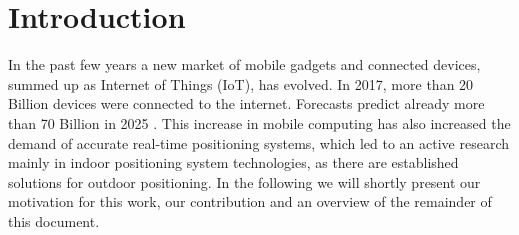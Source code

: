 
\chapter{Introduction} %

\label{Chapter1} %

In the past few years a new market of mobile gadgets and connected devices, summed up as Internet of Things (IoT), has evolved. In 2017, more than 20 Billion devices were connected to the internet. Forecasts predict already more than 70 Billion in 2025 \cite{Statista}. This increase in mobile computing has also increased the demand of accurate real-time positioning systems, which led to an active research mainly in indoor positioning system technologies, as there are established solutions for outdoor positioning.
In the following we will shortly present our motivation for this work, our contribution and an overview of the remainder of this document.


